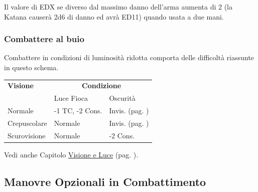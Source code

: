 \begin{multicols}{2}
Il valore di EDX se diverso dal massimo danno dell'arma aumenta di 2 (la Katana causerà 2d6 di danno ed avrà ED11) quando usata a due mani.

\subsubsection{Combattere al buio}

Combattere in condizioni di luminosità ridotta comporta delle difficoltà riassunte in questo schema.

\medskip

\noindent\begin{tabular}{lll}
	\toprule
\textbf{Visione} & \multicolumn{2}{c}{\textbf{Condizione}}\\
& Luce Fioca & Oscurità\\
\hline
Normale & -1 TC, -2 Cons. & Invis. (pag. \pageref{invisibilita})\\
Crepuscolare & Normale & Invis. (pag. \pageref{invisibilita})\\
Scurovisione & Normale & -2 Cons.
\end{tabular}

\medskip

Vedi anche Capitolo \hyperlink{visioneeluce}{Visione e Luce} (pag. \pageref{visioneeluce}).


\subsection{Manovre Opzionali in Combattimento}\label{azioniopzionaliincombattimento}


\end{multicols}

